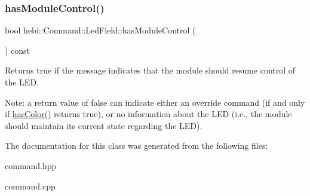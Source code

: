 \subsubsection{\texorpdfstring{has\+Module\+Control()}{hasModuleControl()}}
{\footnotesize\ttfamily bool hebi\+::\+Command\+::\+Led\+Field\+::has\+Module\+Control (\begin{DoxyParamCaption}{ }\end{DoxyParamCaption}) const}



Returns true if the message indicates that the module should resume control of the L\+ED. 

Note\+: a return value of {\ttfamily false} can indicate either an override command (if and only if {\ttfamily \hyperlink{classhebi_1_1Command_1_1LedField_a5526508a64b9bcbf81c221e7788f2ec1}{has\+Color()}} returns {\ttfamily true}), or no information about the L\+ED (i.\+e., the module should maintain it\textquotesingle{}s current state regarding the L\+ED). 

The documentation for this class was generated from the following files\+:\begin{DoxyCompactItemize}
\item 
command.\+hpp\item 
command.\+cpp\end{DoxyCompactItemize}
